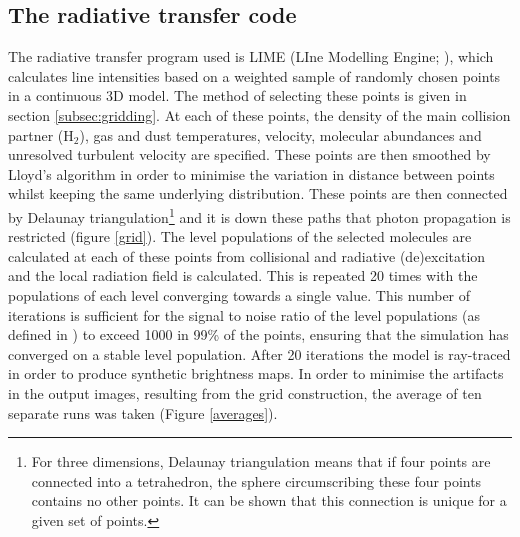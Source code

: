 \documentclass[useAMS,usenatbib]{mn2e}
\begin{document}
\subsection{The radiative transfer code} \label{subsec:radiative_transfer_code}
The radiative transfer program used is LIME (LIne Modelling Engine; \cite{Brinch2010}), which  calculates line intensities based on a weighted sample of randomly chosen points in a continuous 3D model. The method of selecting these points is given in section \ref{subsec:gridding}. At each of these points, the density of the main collision partner (H$_2$), gas and dust temperatures, velocity, molecular abundances and unresolved turbulent velocity are specified. These points are then smoothed by Lloyd's algorithm \citep{Lloyd1982} in order to minimise the variation in distance between points whilst keeping the same underlying distribution. These points are then connected by Delaunay triangulation\footnote{For three dimensions, Delaunay triangulation means that if four points are connected into a tetrahedron, the sphere circumscribing these four points contains no other points. It can be shown that this connection is unique for a given set of points.} and it is down these paths that photon propagation is restricted (figure \ref{grid}). The level populations of the selected molecules are calculated at each of these points from collisional and radiative (de)excitation and the local radiation field is calculated. This is repeated 20 times with the populations of each level converging towards a single value. This number of iterations is sufficient for the signal to noise ratio of the level populations (as defined in \citealt{Brinch2010}) to exceed 1000 in 99\% of the points, ensuring that the simulation has converged on a stable level population. After 20 iterations the model is ray-traced in order to produce synthetic brightness maps. In order to minimise the artifacts in the output images, resulting from the grid construction, the average of ten separate runs was taken (Figure \ref{averages}).
\end{document}
